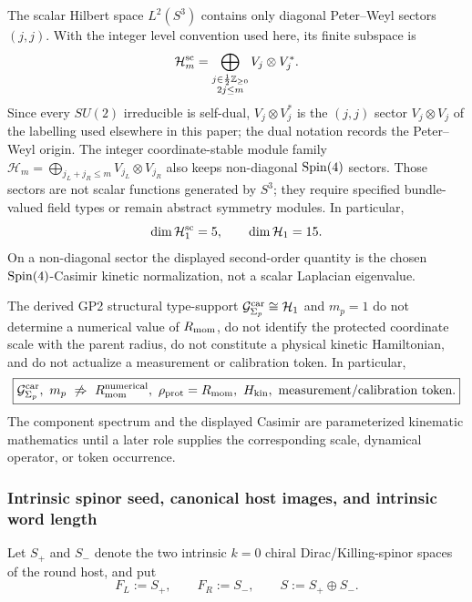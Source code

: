 \documentclass[12pt,a4paper]{article}
\begin{document}
\begin{remark}
\label{p2:rem:scalar-vs-full-carrier-casimir}
The scalar Hilbert space \(L^2(S^3)\) contains only diagonal Peter--Weyl
sectors \((j,j)\).  With the integer level convention used here, its finite
subspace is
\[
 \mathcal H_m^{\rm sc}
 =
 \bigoplus_{\substack{j\in\frac12\mathbb{Z}_{\ge0}\\2j\le m}}
 V_j\otimes V_j^*.
\]
Since every \(SU(2)\) irreducible is self-dual, \(V_j\otimes V_j^*\) is the
\((j,j)\) sector \(V_j\otimes V_j\) of the labelling used elsewhere in this
paper; the dual notation records the Peter--Weyl origin.
The integer coordinate-stable module family
\(\mathcal H_m=\bigoplus_{j_L+j_R\le m}V_{j_L}\otimes V_{j_R}\)
also keeps non-diagonal \(\mathrm{Spin}(4)\) sectors.  Those sectors are not scalar
functions generated by \(S^3\); they require specified bundle-valued field
types or remain abstract symmetry modules.  In particular,
\[
 \dim\mathcal H_1^{\rm sc}=5,
 \qquad
 \dim\mathcal H_1=15.
\]
On a non-diagonal sector the displayed second-order quantity is the chosen
\(\mathrm{Spin}(4)\)-Casimir kinetic normalization, not a scalar Laplacian eigenvalue.
\end{remark}

\begin{remark}
\label{p2b:rem:carrier-scale-kinetic-firewall}
The derived GP2 structural type-support \(\mathcal G^{\rm car}_{\Sigma_p}\cong\mathcal H_1\) and \(m_p=1\)
do not determine a numerical value of \(R_{\mathrm{mom}}\), do not identify the protected
coordinate scale with the parent radius, do not constitute a physical kinetic
Hamiltonian, and do not actualize a measurement or calibration token.  In
particular,
\[
 \boxed{
 \mathcal G^{\rm car}_{\Sigma_p},\ m_p
 \ \not\Rightarrow\
 R_{\mathrm{mom}}^{\rm numerical},\
 \rho_{\rm prot}=R_{\mathrm{mom}},\
 H_{\rm kin},\
 \text{measurement/calibration token}.}
\]
The component spectrum and the displayed Casimir are parameterized kinematic
mathematics until a later role supplies the corresponding scale, dynamical
operator, or token occurrence.
\end{remark}

\subsubsection{Intrinsic spinor seed, canonical host images, and intrinsic word length}
\label{p2:subsec:constructor-grammar-word-length}

Let \(S_+\) and \(S_-\) denote the two intrinsic \(k=0\) chiral
Dirac/Killing-spinor spaces of the round host, and put
\[
 F_L:=S_+,\qquad F_R:=S_-,\qquad S:=S_+\oplus S_-.
\]
\end{document}
